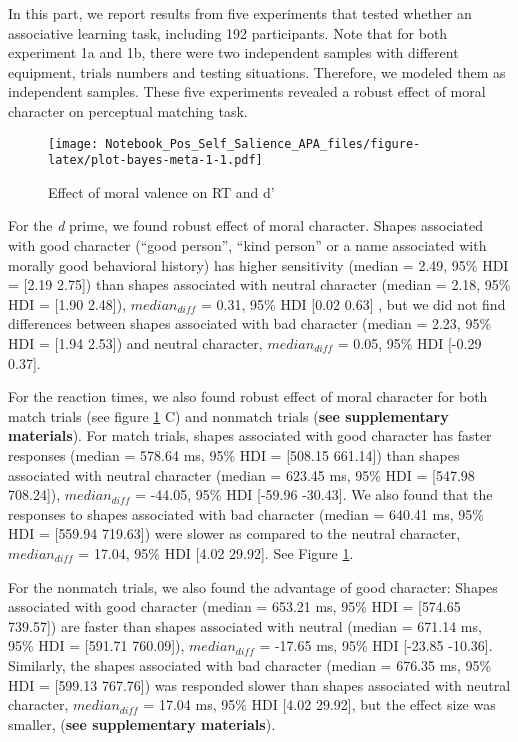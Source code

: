 \documentclass[
  man]{apa6}
\begin{document}
In this part, we report results from five experiments that tested whether an associative learning task, including 192 participants. Note that for both experiment 1a and 1b, there were two independent samples with different equipment, trials numbers and testing situations. Therefore, we modeled them as independent samples. These five experiments revealed a robust effect of moral character on perceptual matching task.

\begin{figure}
\centering
\texttt{[image: Notebook\_Pos\_Self\_Salience\_APA\_files/figure-latex/plot-bayes-meta-1-1.pdf]}
\caption{\label{fig:plot-bayes-meta-1}Effect of moral valence on RT and d'}
\end{figure}

For the \emph{d} prime, we found robust effect of moral character. Shapes associated with good character (``good person'', ``kind person'' or a name associated with morally good behavioral history) has higher sensitivity (median = 2.49, 95\% HDI = {[}2.19 2.75{]}) than shapes associated with neutral character (median = 2.18, 95\% HDI = {[}1.90 2.48{]}), \(median_{diff}\) = 0.31, 95\% HDI {[}0.02 0.63{]} , but we did not find differences between shapes associated with bad character (median = 2.23, 95\% HDI = {[}1.94 2.53{]}) and neutral character, \(median_{diff}\) = 0.05, 95\% HDI {[}-0.29 0.37{]}.

For the reaction times, we also found robust effect of moral character for both match trials (see figure \ref{fig:plot-bayes-meta-1} C) and nonmatch trials (\textbf{see supplementary materials}). For match trials, shapes associated with good character has faster responses (median = 578.64 ms, 95\% HDI = {[}508.15 661.14{]}) than shapes associated with neutral character (median = 623.45 ms, 95\% HDI = {[}547.98 708.24{]}), \(median_{diff}\) = -44.05, 95\% HDI {[}-59.96 -30.43{]}. We also found that the responses to shapes associated with bad character (median = 640.41 ms, 95\% HDI = {[}559.94 719.63{]}) were slower as compared to the neutral character, \(median_{diff}\) = 17.04, 95\% HDI {[}4.02 29.92{]}. See Figure \ref{fig:plot-bayes-meta-1}.

For the nonmatch trials, we also found the advantage of good character: Shapes associated with good character (median = 653.21 ms, 95\% HDI = {[}574.65 739.57{]}) are faster than shapes associated with neutral (median = 671.14 ms, 95\% HDI = {[}591.71 760.09{]}), \(median_{diff}\) = -17.65 ms, 95\% HDI {[}-23.85 -10.36{]}. Similarly, the shapes associated with bad character (median = 676.35 ms, 95\% HDI = {[}599.13 767.76{]}) was responded slower than shapes associated with neutral character, \(median_{diff}\) = 17.04 ms, 95\% HDI {[}4.02 29.92{]}, but the effect size was smaller, (\textbf{see supplementary materials}).
\end{document}
